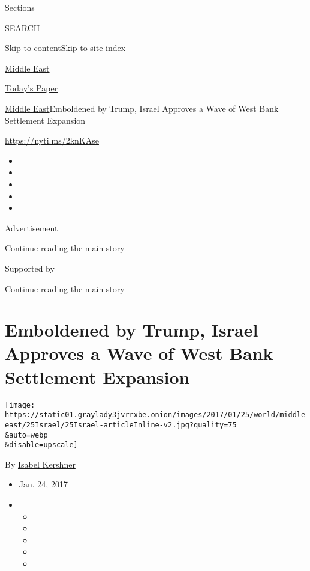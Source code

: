 Sections

SEARCH

\protect\hyperlink{site-content}{Skip to
content}\protect\hyperlink{site-index}{Skip to site index}

\href{https://www.nytimes3xbfgragh.onion/section/world/middleeast}{Middle
East}

\href{https://myaccount.nytimes3xbfgragh.onion/auth/login?response_type=cookie\&client_id=vi}{}

\href{https://www.nytimes3xbfgragh.onion/section/todayspaper}{Today's
Paper}

\href{/section/world/middleeast}{Middle East}\textbar{}Emboldened by
Trump, Israel Approves a Wave of West Bank Settlement Expansion

\url{https://nyti.ms/2knKAse}

\begin{itemize}
\item
\item
\item
\item
\item
\end{itemize}

Advertisement

\protect\hyperlink{after-top}{Continue reading the main story}

Supported by

\protect\hyperlink{after-sponsor}{Continue reading the main story}

\hypertarget{emboldened-by-trump-israel-approves-a-wave-of-west-bank-settlement-expansion}{%
\section{Emboldened by Trump, Israel Approves a Wave of West Bank
Settlement
Expansion}\label{emboldened-by-trump-israel-approves-a-wave-of-west-bank-settlement-expansion}}

\texttt{[image: https://static01.graylady3jvrrxbe.onion/images/2017/01/25/world/middleeast/25Israel/25Israel-articleInline-v2.jpg?quality=75\\\&auto=webp\\\&disable=upscale]}

By \href{https://www.nytimes3xbfgragh.onion/by/isabel-kershner}{Isabel
Kershner}

\begin{itemize}
\item
  Jan. 24, 2017
\item
  \begin{itemize}
  \item
  \item
  \item
  \item
  \item
  \end{itemize}
\end{itemize}

